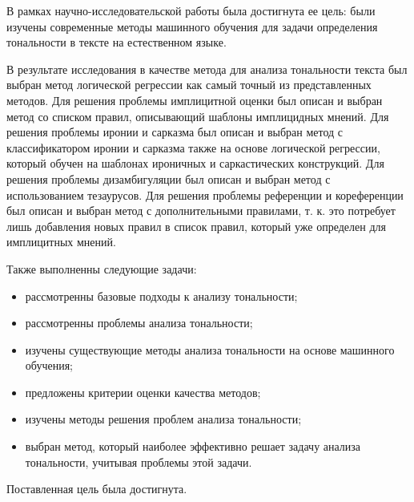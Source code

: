 \documentclass[a4paper,14pt, unknownkeysallowed]{extreport}
\begin{document}
В рамках научно-исследовательской работы была достигнута ее цель: были изучены современные методы машинного обучения для задачи определения тональности в тексте на естественном языке. 

В результате исследования в качестве метода для анализа тональности текста был выбран метод логической регрессии как самый точный из представленных методов. Для решения проблемы имплицитной оценки был описан и выбран метод со списком правил, описывающий шаблоны имплицидных мнений. Для решения проблемы иронии и сарказма был описан и выбран метод с классификатором иронии и сарказма также на основе логической регрессии, который обучен на шаблонах ироничных и саркастических конструкций. Для решения проблемы дизамбигуляции был описан и выбран метод с использованием тезаурусов. Для решения проблемы референции и кореференции был описан и выбран метод с дополнительными правилами, т. к. это потребует лишь добавления новых правил в список правил, который уже определен для имплицитных мнений.

Также выполненны следующие задачи: 
\begin{itemize}
	\item рассмотренны базовые подходы к анализу тональности;
	\item рассмотренны проблемы анализа тональности;
	\item изучены существующие методы анализа тональности на основе машинного обучения;
	\item предложены критерии оценки качества методов;
	\item изучены методы решения проблем анализа тональности;
	\item выбран метод, который наиболее эффективно решает задачу анализа тональности, учитывая проблемы этой задачи.
\end{itemize}

Поставленная цель была достигнута.

\newpage
{}
\renewcommand\bibname{Список литературы} %
\end{document}
